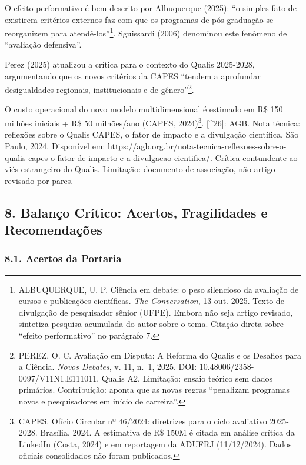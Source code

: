 \documentclass[
  12pt,
  a4paper,
  brazil
]{article}
\begin{document}
O efeito performativo é bem descrito por Albuquerque (2025): ``o simples
fato de existirem critérios externos faz com que os programas de
pós-graduação se reorganizem para atendê-los''\footnote{ALBUQUERQUE, U.
  P. Ciência em debate: o peso silencioso da avaliação de cursos e
  publicações científicas. \emph{The Conversation}, 13 out. 2025. Texto
  de divulgação de pesquisador sênior (UFPE). Embora não seja artigo
  revisado, sintetiza pesquisa acumulada do autor sobre o tema. Citação
  direta sobre ``efeito performativo'' no parágrafo 7.}. Sguissardi
(2006) denominou este fenômeno de ``avaliação defensiva''.

Perez (2025) atualizou a crítica para o contexto do Qualis 2025-2028,
argumentando que os novos critérios da CAPES ``tendem a aprofundar
desigualdades regionais, institucionais e de gênero''\footnote{PEREZ, O.
  C. Avaliação em Disputa: A Reforma do Qualis e os Desafios para a
  Ciência. \emph{Novos Debates}, v. 11, n.~1, 2025. DOI:
  10.48006/2358-0097/V11N1.E111011. Qualis A2. Limitação: ensaio teórico
  sem dados primários. Contribuição: aponta que as novas regras
  ``penalizam programas novos e pesquisadores em início de carreira''.}.

O custo operacional do novo modelo multidimensional é estimado em R\$
150 milhões iniciais + R\$ 50 milhões/ano (CAPES, 2024)\footnote{CAPES.
  Ofício Circular nº 46/2024: diretrizes para o ciclo avaliativo
  2025-2028. Brasília, 2024. A estimativa de R\$ 150M é citada em
  análise crítica da LinkedIn (Costa, 2024) e em reportagem da ADUFRJ
  (11/12/2024). Dados oficiais consolidados não foram publicados.}.
{[}\^{}26{]}: AGB. Nota técnica: reflexões sobre o Qualis CAPES, o fator
de impacto e a divulgação científica. São Paulo, 2024. Disponível em:
https://agb.org.br/nota-tecnica-reflexoes-sobre-o-qualis-capes-o-fator-de-impacto-e-a-divulgacao-cientifica/.
Crítica contundente ao viés estrangeiro do Qualis. Limitação: documento
de associação, não artigo revisado por pares.

\subsection{8. Balanço Crítico: Acertos, Fragilidades e
Recomendações}\label{balanuxe7o-cruxedtico-acertos-fragilidades-e-recomendauxe7uxf5es}

\subsubsection{8.1. Acertos da Portaria}\label{acertos-da-portaria}
\end{document}
